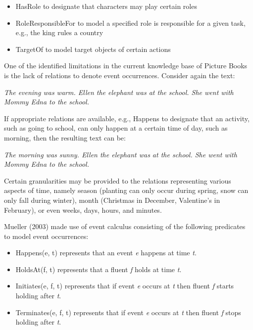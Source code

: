 \begin{itemize}
	\item HasRole to designate that characters may play certain roles
	\item RoleResponsibleFor to model a specified role is responsible for a given task, e.g., the king rules a country
	\item TargetOf to model target objects of certain actions
\end{itemize}

One of the identified limitations in the current knowledge base of Picture Books is the lack of relations to denote event occurrences. Consider again the text:
	
	\noindent
	\hspace{1 in}\emph{The evening was warm. Ellen the elephant was at the school. She went with Mommy Edna to the school.}
	
	If appropriate relations are available, e.g., Happens to designate that an activity, such as going to school, can only happen at a certain time of day, such as morning, then the resulting text can be:
	
	\noindent
	\hspace{1 in}\emph{The morning was sunny. Ellen the elephant was at the school. She went with Mommy Edna to the school.}
	
Certain granularities may be provided to the relations representing various aspects of time, namely season (planting can only occur during spring, snow can only fall during winter), month (Christmas in December, Valentine's in February), or even weeks, days, hours, and minutes.

Mueller (2003) made use of event calculus consisting of the following predicates to model event occurrences:

\begin{itemize}
	\item Happens(e, t) represents that an event \emph{e} happens at time \emph{t}.
	\item HoldsAt(f, t) represents that a fluent \emph{f} holds at time \emph{t}.
	\item Initiates(e, f, t) represents that if event \emph{e} occurs at \emph{t} then fluent \emph{f} starts holding after \emph{t}.
	\item Terminates(e, f, t) represents that if event \emph{e} occurs at \emph{t} then fluent \emph{f} stops holding after \emph{t}.
\end{itemize}

